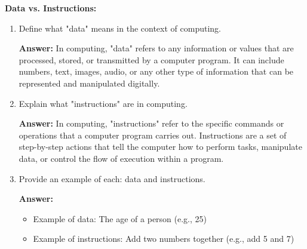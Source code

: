 \documentclass{article}
\begin{document}
\textbf{Data vs. Instructions:}
\begin{enumerate}
    \item Define what "data" means in the context of computing.
    
    \textbf{Answer:}
    In computing, "data" refers to any information or values that are processed, stored, or transmitted by a computer program. It can include numbers, text, images, audio, or any other type of information that can be represented and manipulated digitally.

    \item Explain what "instructions" are in computing.
    
    \textbf{Answer:}
    In computing, "instructions" refer to the specific commands or operations that a computer program carries out. Instructions are a set of step-by-step actions that tell the computer how to perform tasks, manipulate data, or control the flow of execution within a program.

    \item Provide an example of each: data and instructions.
    
    \textbf{Answer:}
    \begin{itemize}
        \item Example of data: The age of a person (e.g., 25)
        \item Example of instructions: Add two numbers together (e.g., add 5 and 7)
    \end{itemize}

\end{enumerate}
\end{document}
